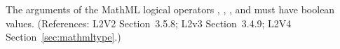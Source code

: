 The arguments of the MathML logical operators ,
, , and  must have boolean values.
(References: L2V2 Section~3.5.8; L2v3 Section~3.4.9; L2V4 
Section~\ref{sec:mathmltype}.)
